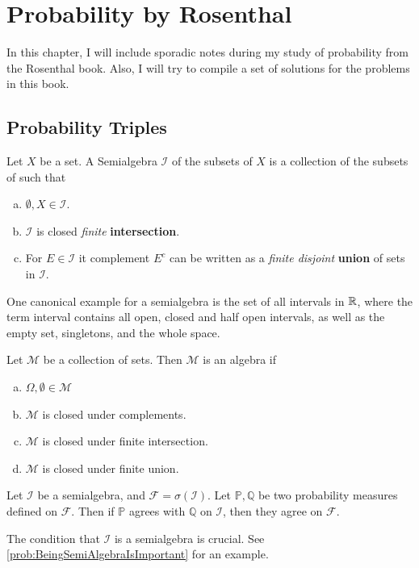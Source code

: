 \chapter{Probability by Rosenthal}
In this chapter, I will include sporadic notes during my study of probability from the Rosenthal book. Also, I will try to compile a set of solutions for the problems in this book.



\section{Probability Triples}

\begin{definition}[Semialgebra]
	Let $ X $ be a set. A Semialgebra $ \mathcal{I} $ of the subsets of $ X $ is a collection of the subsets of such that 
	\begin{enumerate}[(a)]
		\item $ \emptyset, X \in \mathcal{I} $.
		\item $ \mathcal{I} $ is closed \emph{finite} \textbf{intersection}.
		\item For $ E \in \mathcal{I} $ it complement $ E^c $ can be written as a \emph{finite disjoint} \textbf{union} of sets in $ \mathcal{I} $.
	\end{enumerate}
\end{definition}
\begin{remark}
	One canonical example for a semialgebra is the set of all intervals in $ \mathbb{R} $, where the term interval contains all open, closed and half open intervals, as well as the empty set, singletons, and the whole space. 
\end{remark}

\begin{definition}[Algebra]
	Let $ \mathcal{M} $ be a collection of sets. Then $ \mathcal{M} $ is an algebra if 
	\begin{enumerate}[(a)]
		\item $ \Omega, \emptyset \in \mathcal{M} $
		\item $ \mathcal{M} $ is closed under complements.
		\item $ \mathcal{M} $ is closed under finite intersection.
		\item $ \mathcal{M} $ is closed under finite union.
	\end{enumerate}
\end{definition}

\begin{proposition}
	Let $ \mathcal{I} $ be a semialgebra, and $ \mathcal{F} = \sigma(\mathcal{I}) $. Let $ \mathbb{P},\mathbb{Q} $ be two probability measures defined on $ \mathcal{F} $. Then if $ \mathbb{P} $ agrees with $ \mathbb{Q} $ on $ \mathcal{I} $, then they agree on $ \mathcal{F} $.
\end{proposition}
\begin{remark}
	The condition that $ \mathcal{I} $ is a semialgebra is crucial. See \autoref{prob:BeingSemiAlgebraIsImportant} for an example.
\end{remark}


